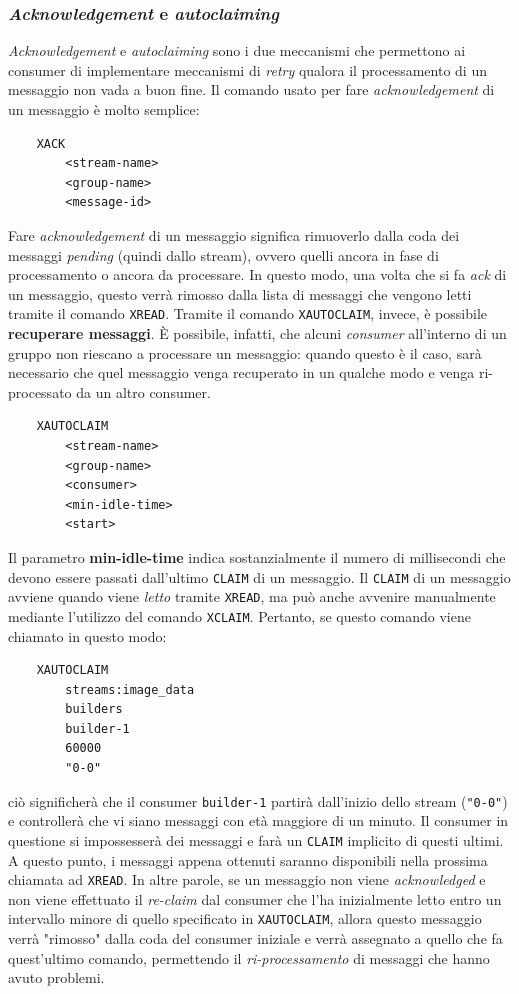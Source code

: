 \subsubsection{\textit{Acknowledgement} e \textit{autoclaiming}}
\textit{Acknowledgement} e \textit{autoclaiming} sono i due meccanismi che permettono ai consumer di implementare meccanismi di \textit{retry} qualora il processamento di un messaggio non vada a buon fine.
\newline
Il comando usato per fare \textit{acknowledgement} di un messaggio è molto semplice:
\begin{verbatim}
    XACK
        <stream-name>
        <group-name>
        <message-id>
\end{verbatim}
Fare \textit{acknowledgement} di un messaggio significa rimuoverlo dalla coda dei messaggi \textit{pending} (quindi dallo stream), ovvero quelli ancora in fase di processamento o ancora da processare. In questo modo, una volta che si fa \textit{ack} di un messaggio, questo verrà rimosso dalla lista di messaggi che vengono letti tramite il comando \verb|XREAD|.
\newline
Tramite il comando \verb|XAUTOCLAIM|, invece, è possibile \textbf{recuperare messaggi}. È possibile, infatti, che alcuni \textit{consumer} all'interno di un gruppo non riescano a processare un messaggio: quando questo è il caso, sarà necessario che quel messaggio venga recuperato in un qualche modo e venga ri-processato da un altro consumer.
\begin{verbatim}
    XAUTOCLAIM 
        <stream-name> 
        <group-name>
        <consumer>
        <min-idle-time> 
        <start>
\end{verbatim}
Il parametro \textbf{min-idle-time} indica sostanzialmente il numero di millisecondi che devono essere passati dall'ultimo \verb|CLAIM| di un messaggio. Il \verb|CLAIM| di un messaggio avviene quando viene \textit{letto} tramite \verb|XREAD|, ma può anche avvenire manualmente mediante l'utilizzo del comando \verb|XCLAIM|. Pertanto, se questo comando viene chiamato in questo modo:
    \begin{verbatim}
    XAUTOCLAIM
        streams:image_data
        builders
        builder-1
        60000
        "0-0"
    \end{verbatim}
ciò significherà che il consumer \verb|builder-1| partirà dall'inizio dello stream (\verb|"0-0"|) e controllerà che vi siano messaggi con età maggiore di un minuto. Il consumer in questione si impossesserà dei messaggi e farà un \verb|CLAIM| implicito di questi ultimi. A questo punto, i messaggi appena ottenuti saranno disponibili nella prossima chiamata ad \verb|XREAD|.
\newline
In altre parole, se un messaggio non viene \textit{acknowledged} e non viene effettuato il \textit{re-claim} dal consumer che l'ha inizialmente letto entro un intervallo minore di quello specificato in \verb|XAUTOCLAIM|, allora questo messaggio verrà "rimosso" dalla coda del consumer iniziale e verrà assegnato a quello che fa quest'ultimo comando, permettendo il \textit{ri-processamento} di messaggi che hanno avuto problemi.
